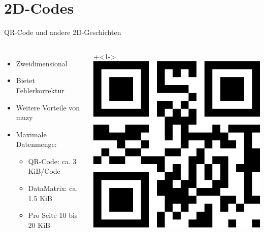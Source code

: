 \section{2D-Codes}

\begin{frame}{QR-Code und andere 2D-Geschichten}
	\begin{columns}
		\begin{itemize}
		\item<2-> Zweidimensional
		\item<3-> Bietet Fehlerkorrektur
		\item<4-> Weitere Vorteile von muzy
		\item<5-> Maximale Datenmenge:
			\begin{itemize}
			\item QR-Code: ca. 3 KiB/Code
			\item DataMatrix: ca. 1.5 KiB
			\item Pro Seite 10 bis 20 KiB
			\end{itemize}
		\end{itemize}
		\onslide+<1->\includegraphics[width=\textwidth]{penma/codes/qr-chaosdorf.png}
	\end{columns}
\end{frame}

